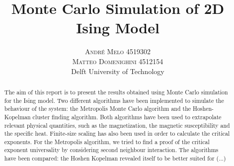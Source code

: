 \documentclass[twoside]{article}
\title{\vspace{-15mm}\fontsize{24pt}{10pt}\selectfont\textbf{Monte Carlo Simulation of 2D Ising Model}} %
\author{
\large
\textsc{Andr\'e Melo 4519302}\\
\textsc{Matteo Domenighini 4512154} \\[2mm] %
\normalsize Delft University of Technology\\ %
\vspace{-5mm}
}
\date{}
\begin{document}
\maketitle %


\begin{abstract}

\noindent The aim of this report is to present the results obtained using Monte Carlo simulation for the Ising model. Two different algorithms have been implemented to simulate the behaviour of the system: the Metropolis Monte Carlo algorithm and the Hoshen-Kopelman cluster finding algorithm. Both algorithms have been used to extrapolate relevant physical quantities, such as the magnetization, the magnetic susceptibility and the specific heat. Finite-size scaling has also been used in order to calculate the critical exponents. For the Metropolis algorithm, we tried to find a proof of the critical exponent universality by considering second neighbour interaction. The algorithms have been compared: the Hoshen Kopelman revealed itself to be better suited for (...)%

\end{abstract}

\end{document}
